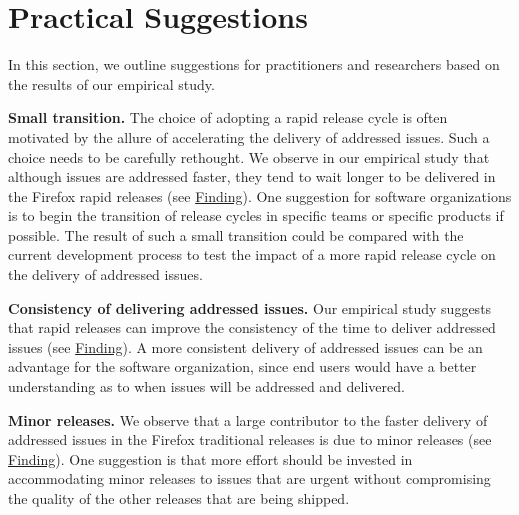 \section{Practical Suggestions} \label{sec:guidelines}

In this section, we outline suggestions for practitioners and researchers based
on the results of our empirical study.

\begin{description}
	\item \textbf{Small transition.} The choice of adopting a rapid release
		cycle is often motivated by the allure of
		accelerating the delivery of addressed issues. Such a choice needs to be
		carefully rethought. We observe in our empirical study that
		although issues are addressed faster, they tend to wait longer
		to be delivered in the Firefox rapid releases (see
		\DIFdelbegin %
\DIFdel{~\ref{obs:2}}\DIFdelend \DIFaddbegin \hyperref[find18]{Finding}\DIFadd{~\ref{find18}}\DIFaddend ). One
		suggestion for software organizations is to begin the transition
		of release cycles in specific teams or specific products if
		possible. The result of such a small transition could be
		compared with the current development process to test the impact
		of a more rapid release cycle on the
		delivery of addressed issues. \\ 
	\item \textbf{Consistency of delivering addressed issues.} Our empirical
		study suggests that rapid releases can improve the consistency
		of the time to deliver addressed issues (see
		\DIFdelbegin %
\DIFdel{~\ref{obs:2}}\DIFdelend \DIFaddbegin \hyperref[find18]{Finding}\DIFadd{~\ref{find18}}\DIFaddend ). A more consistent
		delivery of addressed issues can be an advantage for the
		software organization, since end users would have a better
		understanding as to when issues will be addressed and delivered. \\
	\item \textbf{Minor releases.} We observe that a large contributor to
		the faster delivery of addressed issues in the Firefox
		traditional releases is due to minor releases (see
		\DIFdelbegin %
\DIFdel{~\ref{obs:3}}\DIFdelend \DIFaddbegin \hyperref[find19]{Finding}\DIFadd{~\ref{find19}}\DIFaddend ). One
		suggestion is that more effort should be invested in
		accommodating minor releases to issues that are urgent without
		compromising the quality of the other releases that are being shipped. \\
\end{description}

